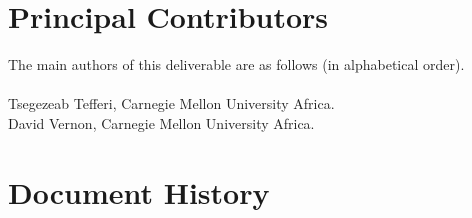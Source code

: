 \documentclass{CSSRforAfrica}
\newcommand{\blank}{~\\}
\begin{document}
 

\pagebreak
\section*{Principal Contributors}
\label{contributors}
The main authors of this deliverable are as follows (in alphabetical order).
\blank
~
\blank
Tsegezeab Tefferi, Carnegie Mellon University Africa.\\   
David Vernon, Carnegie Mellon University Africa.\\   
  

\newpage
\section*{Document History}
\label{document_history}
\end{document}
